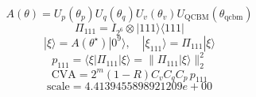 \[
A(\theta) = U_p(\theta_p) U_q(\theta_q) U_v(\theta_v) U_{\mathrm{QCBM}}(\theta_{\mathrm{qcbm}})
\]
\[
\Pi_{111} = I_{2^{6}} \otimes |111\rangle\langle 111|
\]
\[
|\xi\rangle = A(\theta^\star)|0^9\rangle,\quad |\xi_{111}\rangle = \Pi_{111}|\xi\rangle
\]
\[
p_{111} = \langle \xi|\Pi_{111}|\xi\rangle = \|\Pi_{111}|\xi\rangle\|_2^2
\]
\[
\mathrm{CVA} = 2^m(1-R)C_vC_qC_p\,p_{111}
\]
\[
\mathrm{scale} = 4.4139455898921209e+00
\]
